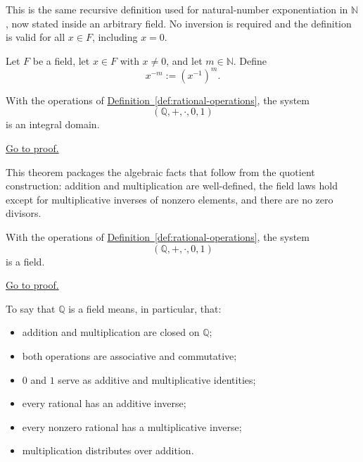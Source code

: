 \begin{remark}
This is the same recursive definition used for natural-number exponentiation
in $\mathbb{N}$, now stated inside an arbitrary field.  No inversion is
required and the definition is valid for all $x\in F$, including $x=0$.
\end{remark}

\begin{definition}
Let $F$ be a field, let $x\in F$ with $x\neq 0$, and let $m\in\mathbb{N}$.
Define
\[
x^{-m}:=(x^{-1})^m.
\]
\end{definition}

\begin{theorem}
\label{thm:q-is-integral-domain}
With the operations of
\hyperref[def:rational-operations]{Definition~\ref*{def:rational-operations}},
the system
\[
(\mathbb{Q},+,\cdot,0,1)
\]
is an integral domain.
\end{theorem}

\begin{remark*}[Proof]
\hyperref[prf:q-is-integral-domain]{Go to proof.}
\end{remark*}

\begin{remark}
This theorem packages the algebraic facts that follow from the quotient
construction: addition and multiplication are well-defined, the field laws hold
except for multiplicative inverses of nonzero elements, and there are no zero
divisors.
\end{remark}

\begin{theorem}
\label{thm:q-is-field}
With the operations of
\hyperref[def:rational-operations]{Definition~\ref*{def:rational-operations}},
the system
\[
(\mathbb{Q},+,\cdot,0,1)
\]
is a field.
\end{theorem}

\begin{remark*}[Proof]
\hyperref[prf:q-is-field]{Go to proof.}
\end{remark*}

\begin{remark}
To say that $\mathbb{Q}$ is a field means, in particular, that:
\begin{itemize}
  \item addition and multiplication are closed on $\mathbb{Q}$;
  \item both operations are associative and commutative;
  \item $0$ and $1$ serve as additive and multiplicative identities;
  \item every rational has an additive inverse;
  \item every nonzero rational has a multiplicative inverse;
  \item multiplication distributes over addition.
\end{itemize}
\end{remark}

